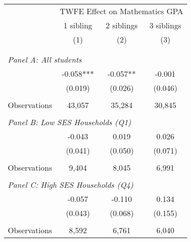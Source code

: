 \makeatletter
{}
{
\makeatother
\begin{tabular}{lccc}
\toprule
\cmidrule(lr){2-4}
& \multicolumn{3}{c}{TWFE Effect on Mathematics GPA} \\
\cmidrule(lr){2-4}
& 1 sibling & 2 siblings & 3 siblings  \\
\cmidrule(lr){2-2} \cmidrule(lr){3-3} \cmidrule(lr){4-4}
& (1) & (2) & (3)\\
\bottomrule
&  &  &  \\
&  &  &   \\
\multicolumn{4}{l}{\textit{Panel A: All students}} \\
\hspace{3mm}        &      -0.058***&      -0.057** &      -0.001   \\
                    &     (0.019)   &     (0.026)   &     (0.046)   \\
                    &               &               &               \\
\hspace{3mm}Observations&      43,057   &      35,284   &      30,845   \\
 
&  &  &   \\
\multicolumn{4}{l}{\textit{Panel B: Low SES Households (Q1)}} \\
\hspace{3mm}        &      -0.043   &       0.019   &       0.026   \\
                    &     (0.041)   &     (0.050)   &     (0.071)   \\
                    &               &               &               \\
\hspace{3mm}Observations&       9,404   &       8,045   &       6,991   \\
 
&  &  &   \\
\multicolumn{4}{l}{\textit{Panel C: High SES Households (Q4)}} \\
\hspace{3mm}        &      -0.057   &      -0.110   &       0.134   \\
                    &     (0.043)   &     (0.068)   &     (0.155)   \\
                    &               &               &               \\
\hspace{3mm}Observations&       8,592   &       6,761   &       6,040   \\
 

\end{tabular}}
